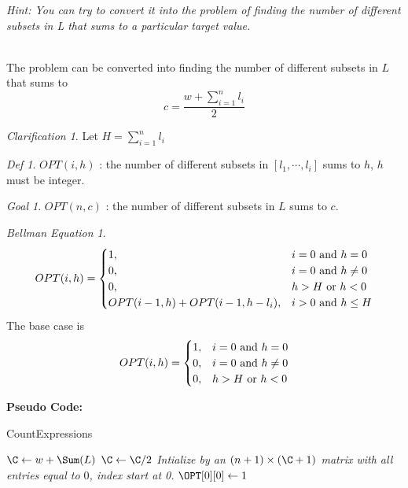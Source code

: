 \documentclass[10.5pt]{article}
\newenvironment{main idea}{\textbf{Main Idea: }}{}
\newenvironment{pseudo}{\textbf{Pseudo Code: }\\}{}
\theoremstyle{remark}
\newtheorem*{define}{Def}
\newtheorem*{goal}{Goal}
\newtheorem*{clarification}{Clarification}
\newtheorem*{bellman}{Bellman Equation}
\begin{document}
\textit{Hint: You can try to convert it into the problem of finding the number of different subsets in L that sums to a particular target value.} \\
\begin{main idea}
\\The problem can be converted into finding the number of different subsets in \(L\) that sums to
\[
	c = \frac{w + \sum_{i = 1}^n l_i}{2}
\]
\begin{clarification}
	Let \(H = \sum_{i = 1}^n l_i\)
\end{clarification}
\begin{define}
	\(OPT(i, h)\) : the number of different subsets in \([l_1,\cdots,l_i]\) sums to \(h\), \(h\) must be integer.
\end{define}
\begin{goal}
	\(OPT(n, c)\) : the number of different subsets in \(L\) sums to \(c\).
\end{goal}
\begin{bellman}
	\[
		OPT(i, h) =
		\begin{cases}
			1,                                   & i = 0 \textup{ and } h = 0    \\
			0,                                   & i = 0 \textup{ and } h \neq 0 \\
			0,                                   & h > H \textup{ or } h < 0     \\
			OPT(i - 1, h) + OPT(i - 1, h - l_i), & i > 0 \textup{ and } h \leq H \\
		\end{cases}
	\]
	The base case is
	\[
		OPT(i, h) =
		\begin{cases}
			1, & i = 0 \textup{ and } h = 0    \\
			0, & i = 0 \textup{ and } h \neq 0 \\
			0, & h > H \textup{ or } h < 0
		\end{cases}
	\]
\end{bellman}
\end{main idea}
\pagebreak
\begin{pseudo}
	\begin{algorithm}[H]
		\DontPrintSemicolon

		\caption{CountExpressions}
		\BlankLine
		\(\C \gets w + \Sum(L) \)\;
		\(\C \gets \C / 2\)\;
		\emph{Intialize \OPT by an \((n + 1) \times (\C + 1)\) matrix with all entries equal to \(0\), index start at 0.}\;
		\(\OPT[0][0] \gets 1\)\;
		\Return{\(\OPT[n][\C]\)}
	\end{algorithm}
\end{pseudo}
\end{document}

